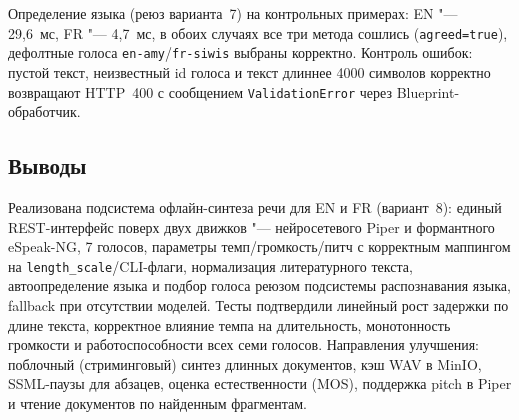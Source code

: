 Определение языка (реюз варианта~7) на контрольных примерах:
EN "--- 29,6~мс, FR "--- 4,7~мс, в обоих случаях все три метода
сошлись (\texttt{agreed=true}), дефолтные голоса
\texttt{en-amy}/\texttt{fr-siwis} выбраны корректно.
Контроль ошибок: пустой текст, неизвестный id голоса и текст длиннее
4000 символов корректно возвращают HTTP~400 с сообщением
\texttt{ValidationError} через Blueprint-обработчик.

\subsection{Выводы}

Реализована подсистема офлайн-синтеза речи для EN и FR
(вариант~8): единый REST-интерфейс поверх двух движков "---
нейросетевого Piper и формантного eSpeak-NG, 7 голосов,
параметры темп/громкость/питч с корректным маппингом на
\texttt{length\_scale}/CLI-флаги, нормализация литературного текста,
автоопределение языка и подбор голоса реюзом подсистемы
распознавания языка, fallback при отсутствии моделей.
Тесты подтвердили линейный рост задержки по длине текста,
корректное влияние темпа на длительность, монотонность громкости
и работоспособности всех семи голосов. Направления улучшения:
поблочный (стриминговый) синтез длинных документов, кэш WAV
в MinIO, SSML-паузы для абзацев, оценка естественности (MOS),
поддержка pitch в Piper и чтение документов по найденным фрагментам.
